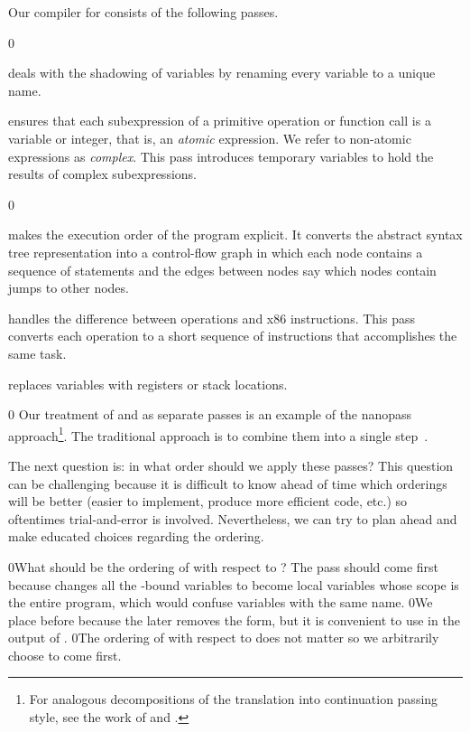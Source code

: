 \documentclass[7x10]{TimesAPriori_MIT}%
\def\racketEd{0}
\def\edition{1}
\newcommand{\racket}[1]{{\if\edition\racketEd{#1}\fi}}
\begin{document}
Our compiler for \LangVar{} consists of the following passes.
%
\begin{description}
{\if\edition\racketEd
\item[\key{uniquify}] deals with the shadowing of variables by
  renaming every variable to a unique name.
  \fi}

\item[\key{remove\_complex\_operands}] ensures that each subexpression
  of a primitive operation or function call is a variable or integer,
  that is, an \emph{atomic} expression. We refer to non-atomic
  expressions as \emph{complex}.  This pass introduces temporary
  variables to hold the results of complex
  subexpressions.%
  
{\if\edition\racketEd
\item[\key{explicate\_control}] makes the execution order of the
  program explicit. It converts the abstract syntax tree representation
  into a control-flow graph in which each node contains a sequence of
  statements and the edges between nodes say which nodes contain jumps
  to other nodes.
\fi}

\item[\key{select\_instructions}] handles the difference between
  \LangVar{} operations and x86 instructions. This pass converts each
  \LangVar{} operation to a short sequence of instructions that
  accomplishes the same task.

\item[\key{assign\_homes}] replaces variables with registers or stack
  locations.
\end{description}
%
{\if\edition\racketEd
%
Our treatment of  and
 as separate passes is an example of the
nanopass approach\footnote{For analogous decompositions of the
  translation into continuation passing style, see the work of
  \citet{Lawall:1993} and \citet{Hatcliff:1994ea}.}.  The traditional
approach is to combine them into a single step~\citep{Aho:2006wb}.
%  
\fi}

The next question is: in what order should we apply these passes? This
question can be challenging because it is difficult to know ahead of
time which orderings will be better (easier to implement, produce more
efficient code, etc.) so oftentimes trial-and-error is
involved. Nevertheless, we can try to plan ahead and make educated
choices regarding the ordering.

\racket{What should be the ordering of  with respect to
\key{uniquify}? The \key{uniquify} pass should come first because
\key{explicate\_control} changes all the \key{let}-bound variables to
become local variables whose scope is the entire program, which would
confuse variables with the same name.}
%
\racket{We place  before \key{explicate\_control}
because the later removes the \key{let} form, but it is convenient to
use \key{let} in the output of .}
%
\racket{The ordering of  with respect to
\key{remove\_complex\_opera*} does not matter so we arbitrarily choose
\key{uniquify} to come first.}
\end{document}

